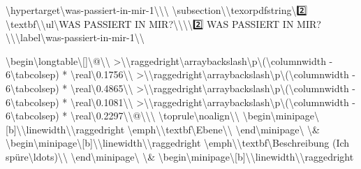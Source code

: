 \textbackslash{}hypertarget\textbackslash{}{was-passiert-in-mir-1\textbackslash{}}\textbackslash{}{\textbackslash{}%
\textbackslash{}subsection\textbackslash{}{\textbackslash{}texorpdfstring\textbackslash{}{2️⃣ \textbackslash{}textbf\textbackslash{}{\textbackslash{}ul\textbackslash{}{WAS PASSIERT IN MIR?\textbackslash{}}\textbackslash{}}\textbackslash{}}\textbackslash{}{2️⃣ WAS PASSIERT IN MIR?\textbackslash{}}\textbackslash{}}\textbackslash{}label\textbackslash{}{was-passiert-in-mir-1\textbackslash{}}\textbackslash{}}

\textbackslash{}begin\textbackslash{}{longtable\textbackslash{}}[]\textbackslash{}{@\textbackslash{}{\textbackslash{}}
  >\textbackslash{}{\textbackslash{}raggedright\textbackslash{}arraybackslash\textbackslash{}}p\textbackslash{}{(\textbackslash{}columnwidth - 6\textbackslash{}tabcolsep) * \textbackslash{}real\textbackslash{}{0.1756\textbackslash{}}\textbackslash{}}
  >\textbackslash{}{\textbackslash{}raggedright\textbackslash{}arraybackslash\textbackslash{}}p\textbackslash{}{(\textbackslash{}columnwidth - 6\textbackslash{}tabcolsep) * \textbackslash{}real\textbackslash{}{0.4865\textbackslash{}}\textbackslash{}}
  >\textbackslash{}{\textbackslash{}raggedright\textbackslash{}arraybackslash\textbackslash{}}p\textbackslash{}{(\textbackslash{}columnwidth - 6\textbackslash{}tabcolsep) * \textbackslash{}real\textbackslash{}{0.1081\textbackslash{}}\textbackslash{}}
  >\textbackslash{}{\textbackslash{}raggedright\textbackslash{}arraybackslash\textbackslash{}}p\textbackslash{}{(\textbackslash{}columnwidth - 6\textbackslash{}tabcolsep) * \textbackslash{}real\textbackslash{}{0.2297\textbackslash{}}\textbackslash{}}@\textbackslash{}{\textbackslash{}}\textbackslash{}}
\textbackslash{}toprule\textbackslash{}noalign\textbackslash{}{\textbackslash{}}
\textbackslash{}begin\textbackslash{}{minipage\textbackslash{}}[b]\textbackslash{}{\textbackslash{}linewidth\textbackslash{}}\textbackslash{}raggedright
\textbackslash{}emph\textbackslash{}{\textbackslash{}textbf\textbackslash{}{Ebene\textbackslash{}}\textbackslash{}}
\textbackslash{}end\textbackslash{}{minipage\textbackslash{}} \textbackslash{}& \textbackslash{}begin\textbackslash{}{minipage\textbackslash{}}[b]\textbackslash{}{\textbackslash{}linewidth\textbackslash{}}\textbackslash{}raggedright
\textbackslash{}emph\textbackslash{}{\textbackslash{}textbf\textbackslash{}{Beschreibung (Ich spüre\textbackslash{}ldots)\textbackslash{}}\textbackslash{}}
\textbackslash{}end\textbackslash{}{minipage\textbackslash{}} \textbackslash{}& \textbackslash{}begin\textbackslash{}{minipage\textbackslash{}}[b]\textbackslash{}{\textbackslash{}linewidth\textbackslash{}}\textbackslash{}raggedright
